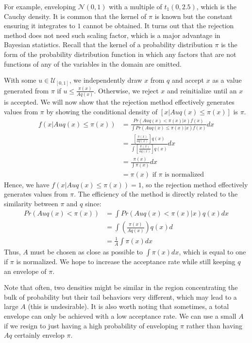 \documentclass[paper=a4, fontsize=12pt]{scrartcl} %
\numberwithin{equation}{section} %
\numberwithin{figure}{section} %
\numberwithin{table}{section} %
\begin{document}
For example, enveloping $\mathcal{N}(0, 1)$ with a multiple of $t_1(0, 2.5)$, which is the Cauchy density. 
It is common that the kernel of $\pi$ is known but the constant ensuring it integrates to $1$ cannot be obtained. 
It turns out that the rejection method does not need such scaling factor, which is a major advantage 
in Bayesian statistics. Recall that the kernel of a probability distribution $\pi$ is the 
form of the probability distribution function in which any factors that are not functions of any of the 
variables in the domain are omitted.

With some $u \in \mathcal{U}_{[0, 1]}$, we independently draw $x$ from $q$ and accept $x$ as a value generated 
from $\pi$ if $u \le \frac{\pi(x)}{Aq(x)}$. Otherwise, we reject $x$ and reinitialize until an $x$ is accepted.
We will now show that the rejection method effectively generates values from $\pi$ by showing the conditional density 
of $[x | Auq(x) \le \pi(x)]$ is $\pi$.
\begin{align*}
    f(x|Auq(x) \le \pi(x)) &=\frac{Pr(Auq(x) < \pi(x)|x)f(x)}{\int Pr(Auq(x) \le \pi(x)|x)f(x)}dx \\
    & =\frac{[\frac{\pi(x)}{aq(x)}]q(x)}{\int [\frac{\pi(x)}{aq(x)}]q(x)}dx\\
    &= \frac{\pi(x)}{\int \pi(x)}dx\\
    &= \pi(x) \text{   if $\pi$ is normalized}
\end{align*}
Hence, we have $f(x| Auq(x) \le \pi(x)) = 1$, so the rejection method effectively generates values from $\pi$.
The efficiency of the method is directly related to the similarity between $\pi$ and $q$ since:
\begin{align*}
    Pr(Auq(x) < \pi(x)) &= \int Pr(Auq(x) < \pi(x) | x) q(x) dx\\
    &= \int(\frac{\pi(x)}{Aq(x)})q(x) d\\
    &= \frac{1}{A}\int \pi(x) dx
\end{align*}
Thus, $A$ must be chosen as close as possible to $\int \pi(x) dx$, which is equal to one if $\pi$ is normalized.
We hope to increase the acceptance rate while still keeping $q$ an envelope of $\pi$.

Note that often, two densities might be similar in the region concentrating the bulk of probability but their tail behaviors very different, which may lead to a large $A$ (this is undesirable). It 
is also worth noting that sometimes, a total envelope can only be achieved with a low acceptance rate.
We can use a small $A$ if we resign to just having a high probability of enveloping $\pi$ rather than having $Aq$ certainly envelop $\pi$.
\end{document}
